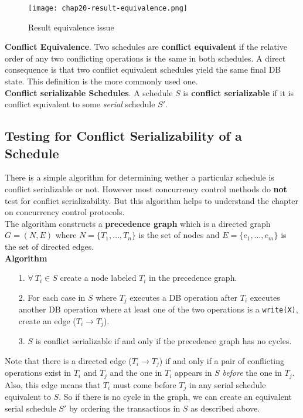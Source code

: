 \begin{figure}
    \centering
    \texttt{[image: chap20-result-equivalence.png]}
    \caption{Result equivalence issue}
    \label{fig:chap20-result-equivalence}
\end{figure}

\textbf{Conflict Equivalence}. Two schedules are \textbf{conflict equivalent} if the relative order of any two conflicting operations is the same in both schedules. A direct consequence is that two conflict equivalent schedules yield the same final DB state. This definition is the more commonly used one. \\

\textbf{Conflict serializable Schedules}. A schedule $S$ is \textbf{conflict serializable} if it is conflict equivalent to some \textit{serial} schedule $S'$.


\subsection{Testing for Conflict Serializability of a Schedule}
There is a simple algorithm for determining wether a particular schedule is conflict serializable or not. However most concurrency control methods do \textbf{not} test for conflict serializability. But this algorithm helps to understand the chapter on concurrency control protocols.\\

The algorithm constructs a \textbf{precedence graph} which is a directed graph $G=(N,E)$ where $N = \{T_1,\dots,T_n\}$ is the set of nodes and $E=\{e_1,\dots,e_m\}$ is the set of directed edges. \\

\textbf{Algorithm}
\begin{itemize}
    \item[1.] $\forall~T_i \in S$ create a node labeled $T_i$ in the precedence graph.
    \item[2.] For each case in $S$ where $T_j$ executes a DB operation after $T_i$ executes another DB operation where at least one of the two operations is a \texttt{write(X)}, create an edge ($T_i \rightarrow T_j$).
    \item[3.] $S$ is conflict serializable if and only if the precedence graph has no cycles.
\end{itemize}

Note that there is a directed edge ($T_i \rightarrow T_j$) if and only if a pair of conflicting operations exist in $T_i$ and $T_j$ and the one in $T_i$ appears in $S$ \textit{before} the one in $T_j$. Also, this edge means that $T_i$ must come before $T_j$ in any serial schedule equivalent to $S$. So if there is no cycle in the graph, we can create an equivalent serial schedule $S'$ by ordering the transactions in $S$ as described above.

